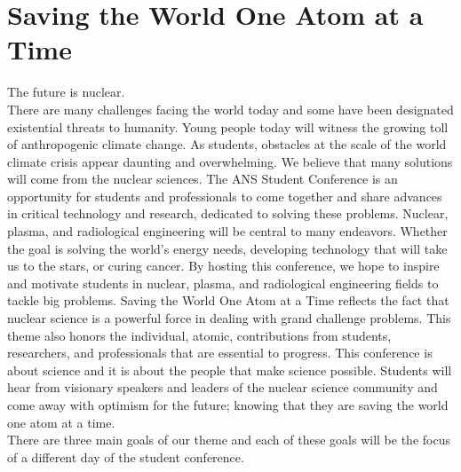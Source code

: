 \section{Saving the World One Atom at a Time}
The future is nuclear.\\
There are many challenges facing the world today and some have been designated existential threats to humanity. Young people today will witness the growing toll of anthropogenic climate change. As students, obstacles at the scale of the world climate crisis appear daunting and overwhelming. We believe that many solutions will come from the nuclear sciences. The ANS Student Conference is an opportunity for students and professionals to come together and share advances in critical technology and research, dedicated to solving these problems. Nuclear, plasma, and radiological engineering will be central to many endeavors. Whether the goal is solving the world’s energy needs, developing technology that will take us to the stars, or curing cancer. By hosting this conference, we hope to inspire and motivate students in nuclear, plasma, and radiological engineering fields to tackle big problems. Saving the World One Atom at a Time reflects the fact that nuclear science is a powerful force in dealing with grand challenge problems. This theme also honors the individual, atomic, contributions from students, researchers, and professionals that are essential to progress. This conference is about science and it is about the people that make science possible. Students will hear from visionary speakers and leaders of the nuclear science community and come away with optimism for the future; knowing that they are saving the world one atom at a time.\\
There are three main goals of our theme and each of these goals will be the focus of a different day of the student conference.
